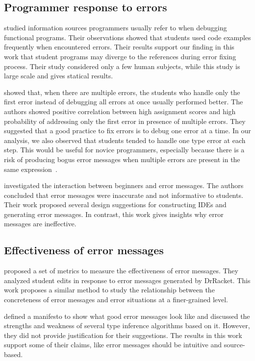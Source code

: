 \documentclass[12pt]{report}	%
\begin{document}
\subsection{Programmer response to errors}

\cite{chambers2012function} studied information sources programmers
usually refer to when debugging functional
programs.
Their observations showed that students used
code examples frequently
when encountered errors.
Their results support our finding in this work that
student programs may diverge to the references
during error fixing process. Their study
considered only a few human subjects, while this study is
large scale and gives statical results.

\cite{munson2016analyzing}
showed that, when there are multiple errors,
the students who handle only the first error
instead of debugging all errors at once usually
performed better.
The authors showed positive correlation
between high assignment scores and
high probability of addressing only
the first error in presence of multiple errors.
%
They suggested that a good practice to fix
errors is to debug one error at a time.
In our analysis, we also observed that
students tended to handle one type error at each step.
This would be useful for novice programmers, especially
because there is a risk of producing bogus error messages
when multiple errors are present in
the same expression~\cite{Heeren05:TQT}.

\cite{marceau2011mind} investigated the interaction between
beginners and error messages.
The authors concluded that error messages were
inaccurate and not informative to students.
Their work proposed several design
suggestions for constructing IDEs and generating
error messages.
In contrast, this work gives insights
why error messages are ineffective.

\subsection{Effectiveness of error messages}

\cite{marceau2011measuring} proposed a set of metrics to
measure the effectiveness of
error messages.
They analyzed student edits
in response to error messages generated by DrRacket.
This work proposes a similar method to study
the relationship between
the concreteness of error messages and
error situations at a finer-grained level.

\cite{yang2000improved} defined a manifesto to show
what good error messages look like and discussed
the strengths and weakness of several type inference
algorithms based on it.
However, they did not provide justification
for their suggestions.
The results in this work support some of their claims,
like error messages
should be intuitive and source-based.
\end{document}
